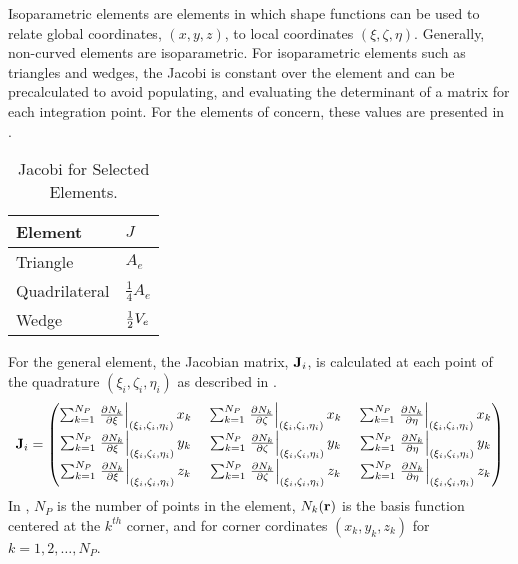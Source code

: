     Isoparametric elements are elements in which shape functions can be used to
    relate global coordinates, $(x,y,z)$, to local coordinates
    $(\xi,\zeta,\eta)$. Generally, non-curved elements are isoparametric. For 
    isoparametric elements such as triangles and wedges, the Jacobi is constant 
    over the element and can be precalculated to avoid populating, and 
    evaluating the determinant of a matrix for each integration point. For the 
    elements of concern, these values are presented in  
    \cite{textbookcolorado}.
    \begin{table}
      \caption{Jacobi for Selected Elements.}
      \label{tab:jacobi}
      \begin{center}
        \begin{tabular}{ll}
          \toprule
          Element & $J$ \\
          \midrule
          Triangle      & $A_e$ \\
          Quadrilateral & $\frac{1}{4} A_e$ \\
          Wedge         & $\frac{1}{2} V_e$ \\
          \bottomrule
        \end{tabular}
      \end{center}
    \end{table}

    For the general element, the Jacobian matrix, $\mathbf{J}_i$, is calculated at each
    point of the quadrature $(\xi_i,\zeta_i,\eta_i)$ as described in
    .
    \begin{equation}
      \label{eq:calcJacobian}
      \mathbf{J}_i = 
      \begin{pmatrix}
        \sum_{k=1}^{N_P} \left. \frac{\partial N_k}{\partial \xi}
          \right|_{(\xi_i,\zeta_i,\eta_i)} x_k   \; &
        \sum_{k=1}^{N_P} \left. \frac{\partial N_k}{\partial \zeta}
          \right|_{(\xi_i,\zeta_i,\eta_i)} x_k   \; &
        \sum_{k=1}^{N_P} \left. \frac{\partial N_k}{\partial \eta} 
          \right|_{(\xi_i,\zeta_i,\eta_i)} x_k   \\
        \sum_{k=1}^{N_P} \left. \frac{\partial N_k}{\partial \xi}
          \right|_{(\xi_i,\zeta_i,\eta_i)} y_k   \; &
        \sum_{k=1}^{N_P} \left. \frac{\partial N_k}{\partial \zeta} 
          \right|_{(\xi_i,\zeta_i,\eta_i)} y_k   \; &
        \sum_{k=1}^{N_P} \left. \frac{\partial N_k}{\partial \eta} 
          \right|_{(\xi_i,\zeta_i,\eta_i)} y_k   \\
        \sum_{k=1}^{N_P} \left. \frac{\partial N_k}{\partial \xi}
          \right|_{(\xi_i,\zeta_i,\eta_i)} z_k   \; &
        \sum_{k=1}^{N_P} \left. \frac{\partial N_k}{\partial \zeta} 
          \right|_{(\xi_i,\zeta_i,\eta_i)} z_k   \; &
        \sum_{k=1}^{N_P} \left. \frac{\partial N_k}{\partial \eta} 
          \right|_{(\xi_i,\zeta_i,\eta_i)} z_k   
      \end{pmatrix}
    \end{equation}
    In , $N_P$ is the number of points in the element, 
    $N_k(\mathbf{r})$ is the basis function centered at the $k^{th}$ corner, and 
    for corner cordinates $(x_k,y_k,z_k)$ for $k = 1,2,\ldots,N_P$.

